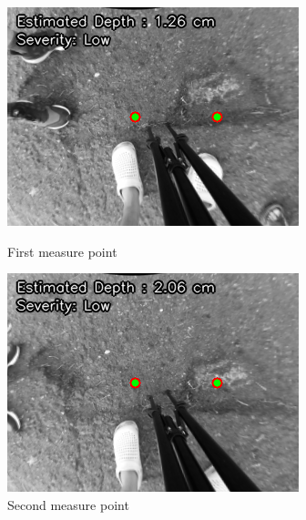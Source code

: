\begin{figure}[H]
	\centering
	\begin{minipage}{0.45\textwidth}
		\centering
		\includegraphics[width=\textwidth]{measure1.png}
		\caption{First measure point}
		\label{fig:image1}
	\end{minipage}
	\hfill
	\begin{minipage}{0.45\textwidth}
		\centering
		\includegraphics[width=\textwidth]{measure2.png}
		\caption{Second measure point}
		\label{fig:image2}
	\end{minipage}
\end{figure}
